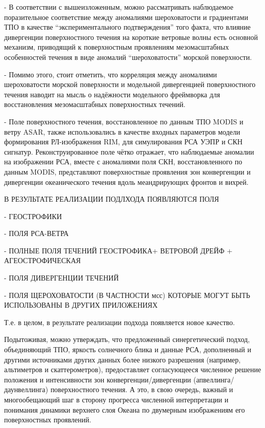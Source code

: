 - В соответствии с вышеизложенным, можно рассматривать наблюдаемое поразительное соответствие между аномалиями шероховатости и градиентами ТПО в качестве ``экспериментального подтверждения'' того факта, что влияние дивергенции поверхностного течения на короткие ветровые волны есть основной механизм, приводящий к поверхностным проявлениям мезомасштабных особенностей течения в виде аномалий ``шероховатости'' морской поверхности. 

- Помимо этого, стоит отметить, что корреляция между аномалиями шероховатости морской поверхности и модельной дивергенцией поверхностного течения наводит на мысль о надёжности модельного фреймворка для восстановления мезомасштабных поверхностных течений.

- Поле поверхностного течения, восстановленное по данным ТПО MODIS и ветру ASAR, также использовались в качестве входных параметров модели формирования РЛ-изображения RIM, для симулирования РСА УЭПР и СКН сигнатур. Реконструированное поле чётко отражает, что наблюдаемые аномалии на изображении РСА, вместе с аномалиями поля СКН, восстановленного по данным MODIS, представляют поверхностные проявления зон конвергенции и дивергенции океанического течения вдоль меандрирующих фронтов и вихрей.



В РЕЗУЛЬТАТЕ РЕАЛИЗАЦИИ ПОДЛХОДА ПОЯВЛЯЮТСЯ ПОЛЯ



- ГЕОСТРОФИКИ

- ПОЛЯ РСА-ВЕТРА

- ПОЛНЫЕ ПОЛЯ ТЕЧЕНИЙ ГЕОСТРОФИКА+ ВЕТРОВОЙ ДРЕЙФ + АГЕОСТРОФИЧЕСКАЯ 

- ПОЛЯ ДИВЕРГЕНЦИИ ТЕЧЕНИЙ

- ПОЛЯ ЩЕРОХОВАТОСТИ (В ЧАСТНОСТИ мсс) КОТОРЫЕ МОГУТ БЫТЬ ИСПОЛЬЗОВАНЫ В ДРУГИХ ПРИЛОЖЕНИЯХ

Т.е. в целом, в результате реализации подхода появляется новое качество. 

Подытоживая, можно утверждать, что предложенный синергетический подход, объединяющий ТПО, яркость солнечного блика и данные РСА, дополненный и другими источниками других данных более низкого разрешения (например, альтиметров и скаттерометров), предоставляет согласующееся численное решение положения и интенсивности зон конвергенции/дивергенции (апвеллинга/даунвеллинга) поверхностного течения. А это, в свою очередь, важный и многообещающий шаг в сторону прогресса численной интерпретации и понимания динамики верхнего слоя Океана по двумерным изображениям его поверхностных проявлений.



\clearpage
